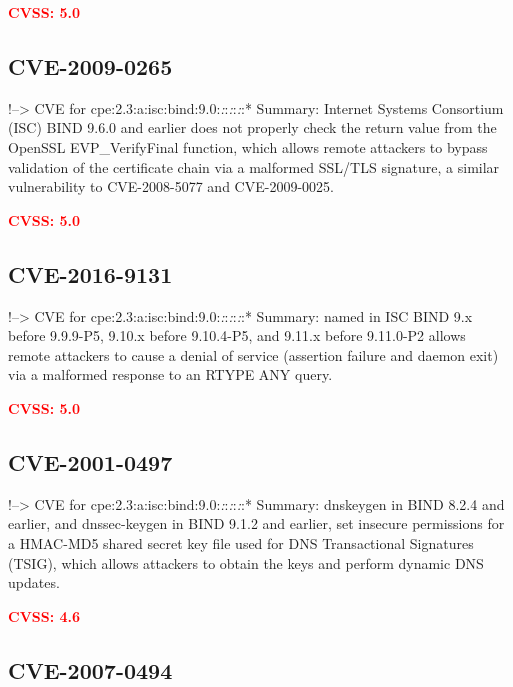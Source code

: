 \documentclass[a4paper, 12pt]{article}
\begin{document}
\textbf{\textcolor{red}{CVSS: 5.0}}

\hypertarget{cve-2009-0265}{%
\subsection{CVE-2009-0265}\label{cve-2009-0265}}

!--\textgreater{} CVE for
cpe:2.3:a:isc:bind:9.0:\emph{:}:\emph{:}:\emph{:}:* Summary: Internet
Systems Consortium (ISC) BIND 9.6.0 and earlier does not properly check
the return value from the OpenSSL EVP\_VerifyFinal function, which
allows remote attackers to bypass validation of the certificate chain
via a malformed SSL/TLS signature, a similar vulnerability to
CVE-2008-5077 and CVE-2009-0025.

\textbf{\textcolor{red}{CVSS: 5.0}}

\hypertarget{cve-2016-9131}{%
\subsection{CVE-2016-9131}\label{cve-2016-9131}}

!--\textgreater{} CVE for
cpe:2.3:a:isc:bind:9.0:\emph{:}:\emph{:}:\emph{:}:* Summary: named in
ISC BIND 9.x before 9.9.9-P5, 9.10.x before 9.10.4-P5, and 9.11.x before
9.11.0-P2 allows remote attackers to cause a denial of service
(assertion failure and daemon exit) via a malformed response to an RTYPE
ANY query.

\textbf{\textcolor{red}{CVSS: 5.0}}

\hypertarget{cve-2001-0497}{%
\subsection{CVE-2001-0497}\label{cve-2001-0497}}

!--\textgreater{} CVE for
cpe:2.3:a:isc:bind:9.0:\emph{:}:\emph{:}:\emph{:}:* Summary: dnskeygen
in BIND 8.2.4 and earlier, and dnssec-keygen in BIND 9.1.2 and earlier,
set insecure permissions for a HMAC-MD5 shared secret key file used for
DNS Transactional Signatures (TSIG), which allows attackers to obtain
the keys and perform dynamic DNS updates.

\textbf{\textcolor{red}{CVSS: 4.6}}

\hypertarget{cve-2007-0494}{%
\subsection{CVE-2007-0494}\label{cve-2007-0494}}
\end{document}
